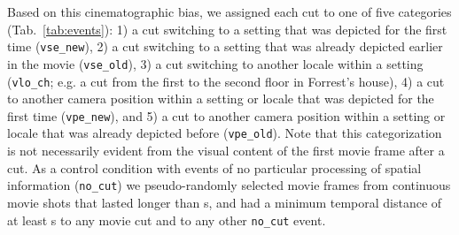 \documentclass[english]{article}
\begin{document}

Based on this cinematographic bias, we assigned each cut to one of five
categories (Tab.~\ref{tab:events}):
%
1) a cut switching to a setting that was depicted for the first time
(\texttt{vse\_new}),
%
2) a cut switching to a setting that was already depicted earlier in the movie
(\texttt{vse\_old}),
%
3) a cut switching to another locale within a setting (\texttt{vlo\_ch}; e.g. a
cut from the first to the second floor in Forrest's house),
%
4) a cut to another camera position within a setting or locale that was depicted
for the first time (\texttt{vpe\_new}), and
%
5) a cut to another camera position within a setting or locale that was already
depicted before (\texttt{vpe\_old}).
Note that this categorization is not necessarily evident from the visual content
of the first movie frame after a cut.
As a control condition with events of no particular processing of spatial
information (\texttt{no\_cut}) we pseudo-randomly selected movie frames from
continuous movie shots that lasted longer than \unit[20]{s}, and
had a minimum temporal distance of at least \unit[10]{s} to any movie cut and to
any other \texttt{no\_cut} event.
\end{document}
